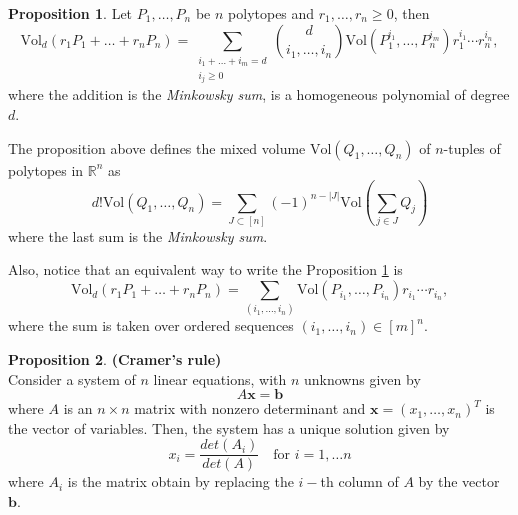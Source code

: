 \documentclass[english,11pt]{article}
\theoremstyle{definition}
\theoremstyle{definition}
\newtheorem{proposition}{Proposition}[section]
\theoremstyle{definition}
\theoremstyle{remark}
\theoremstyle{definition}
\begin{document}
\begin{proposition}
Let $P_1, \dots, P_n$ be $n$ polytopes and $r_1, \dots, r_n \geq 0$, then 
$$\text{Vol}_d(r_1P_1 + \dots + r_nP_n)= \sum_{\substack{i_1+\dots+i_m=d\\i_j\geq 0}} \binom{d}{i_1, \dots, i_n} \text{Vol}(P_1^{i_1}, \dots, P_n^{i_m}) r_1^{i_1}\cdots r_n^{i_n},$$
where the addition is the \textit{Minkowsky sum}, is a homogeneous polynomial of degree $d$.
\label{prop3.1}
\end{proposition}

The proposition above defines the mixed volume $\text{Vol}(Q_1,\dots,Q_n)$ of $n$-tuples of polytopes in $\mathbb{R}^n$ as
$$d!\text{Vol}(Q_1,\dots,Q_n)= \sum_{J\subset[n]} (-1)^{n-|J|}\text{Vol}(\sum_{j\in J}Q_j)$$
where the last sum is the \textit{Minkowsky sum}.

Also, notice that an equivalent way to write the Proposition \ref{prop3.1} is
$$\text{Vol}_d(r_1P_1 + \dots + r_nP_n)= \sum_{(i_1, \dots, i_n)} \text{Vol}(P_{i_1}, \dots, P_{i_n})r_{i_1}\cdots r_{i_n},$$
where the sum is taken over ordered sequences $(i_1, \dots, i_n) \in [m]^n$.

\begin{proposition}\textbf{(Cramer's rule)}\\
Consider a system of $n$ linear equations, with $n$ unknowns given by
$$A\mathbf{x}=\mathbf{b}$$
where $A$ is an $n\times n$ matrix with nonzero determinant and $\mathbf{x}=(x_1, \dots, x_n)^T$ is the vector of variables. Then, the system has a unique solution given by
$$x_i= \frac{det(A_i)}{det(A)} \quad \text{for } i=1,\dots n$$
where $A_i$ is the matrix obtain by replacing the $i-$th column of $A$ by the vector $\mathbf{b}$.
\label{Cramer}
\end{proposition}
\end{document}
